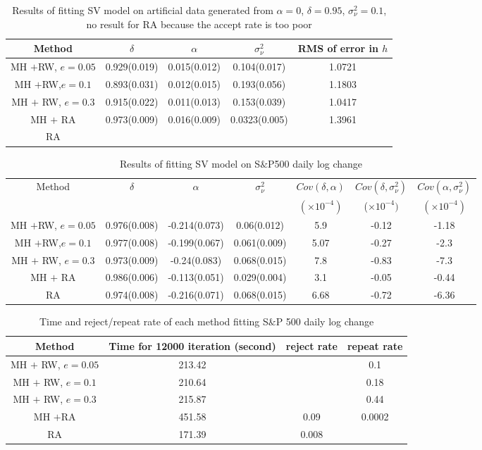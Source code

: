 \documentclass{article}
\begin{document}
\begin{table}[H]
\centering
\begin{tabular}{|c|c|c|c|c|}
\hline
Method& $\delta$ & $\alpha$& $\sigma_\nu^2$ & RMS of error in $h$ \\
\hline
MH $+$RW, $e=0.05$ & 0.929(0.019) & 0.015(0.012) & 0.104(0.017)&1.0721 \\
\hline
MH $+$RW,$e=0.1$& 0.893(0.031) & 0.012(0.015)  &0.193(0.056) &1.1803\\
\hline
MH $+$ RW, $e=0.3$ & 0.915(0.022) &  0.011(0.013) & 0.153(0.039) &1.0417\\
\hline
MH $+$ RA &  0.973(0.009) & 0.016(0.009) & 0.0323(0.005) & 1.3961\\
\hline
RA&  &  && \\
\hline
\end{tabular}
\caption{Results of fitting SV model on artificial data generated from $\alpha=0$, $\delta=0.95$, $\sigma_\nu^2=0.1$, no result for RA because the accept rate is too poor}\label{10}
\end{table}

\begin{table}[H]
\centering
\begin{tabular}{|c|c|c|c|c|c|c|}
\hline
Method& $\delta$ & $\alpha$& $\sigma_\nu^2$& $Cov(\delta,\alpha)$& $Cov(\delta,\sigma_\nu^2)$&$Cov(\alpha,\sigma_\nu^2)$  \\
&&&&$(\times 10^{-4})$&($\times 10^{-4})$&$(\times 10^{-4})$\\
\hline
MH $+$RW, $e=0.05$ & 0.976(0.008) & -0.214(0.073) & 0.06(0.012) &5.9&-0.12& -1.18 \\
\hline
MH $+$RW,$e=0.1$& 0.977(0.008) &  -0.199(0.067) & 0.061(0.009)&5.07&-0.27&-2.3\\
\hline
MH $+$ RW, $e=0.3$ & 0.973(0.009) & -0.24(0.083) & 0.068(0.015)&7.8&-0.83&-7.3\\
\hline
MH $+$ RA &  0.986(0.006) & -0.113(0.051) & 0.029(0.004)&3.1&-0.05&-0.44\\
\hline
RA& 0.974(0.008) & -0.216(0.071) & 0.068(0.015)&6.68&-0.72&-6.36\\
\hline
\end{tabular}
\caption{Results of fitting SV model on S$\&$P500 daily log change}\label{2}
\end{table}

\begin{table}[H]
\begin{tabular}{|c|c|c|c|}
\hline
Method&Time for 12000 iteration (second)& reject rate& repeat rate  \\
\hline
MH $+$ RW, $e=0.05$ & 213.42 &  & 0.1\\
\hline
MH $+$ RW, $e=0.1$&  210.64 &  & 0.18 \\
\hline
MH $+$ RW, $e=0.3$ & 215.87 &  & 0.44\\
\hline
MH $+$RA & 451.58 & 0.09 & 0.0002\\
\hline
RA & 171.39 & 0.008 & \\
\hline
\end{tabular}
\caption{Time and reject/repeat rate of each method fitting S$\&$P 500 daily log change}\label{6}
\end{table}
\end{document}
